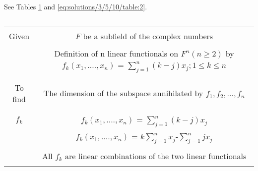 See Tables \ref{eq:solutions/3/5/10/table:1} and \ref{eq:solutions/3/5/10/table:2}.


\begin{table}[ht!]
\begin{center}
\begin{tabular}{|c|c|}
\hline
& \\
Given & $F$ be a subfield of the complex numbers\\
& \\
& Definition of n linear functionals on $F^n(n \ge 2)$ by $f_k(x_1,....,x_n)$ = $\sum_{j=1}^{n}(k-j)x_j; 1 \le k \le n$ \\
& \\
\hline
& \\
To find & The dimension of the subspace annihilated by $f_1,f_2,...,f_n$ \\
& \\
\hline
& \\
$f_k$ & $f_k(x_1,....,x_n)$ = $\sum_{j=1}^{n}(k-j)x_j$\\
& $f_k(x_1,....,x_n)$ = $k\sum_{j=1}^{n}x_j$-$\sum_{j=1}^{n}jx_j$\\
& \\
& All $f_k$ are linear combinations of the two linear functionals  \\
& \\
\hline
\end{tabular}
\end{center}
\caption{}
\label{eq:solutions/3/5/10/table:1}
\end{table}
%
